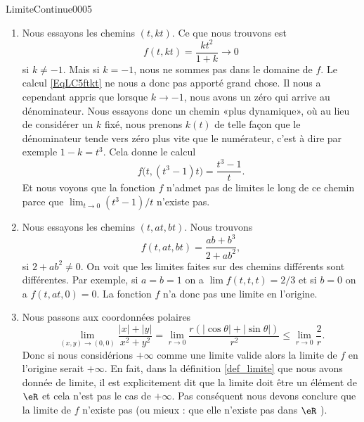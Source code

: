 \begin{corrige}{LimiteContinue0005}

	\begin{enumerate}
		\item
			Nous essayons les chemins $(t,kt)$. Ce que nous trouvons est
			\begin{equation}		\label{EqLC5ftkt}
				f(t,kt)=\frac{ kt^2 }{ 1+k }\to 0
			\end{equation}
			si $k\neq -1$. Mais si $k=-1$, nous ne sommes pas dans le domaine de $f$. Le calcul \eqref{EqLC5ftkt} ne nous a donc pas apporté grand chose. Il nous a cependant appris que lorsque $k\to -1$, nous avons un zéro qui arrive au dénominateur. Nous essayons donc un chemin «plus dynamique», où au lieu de considérer un $k$ fixé, nous prenons $k(t)$ de telle façon que le dénominateur tende vers zéro plus vite que le numérateur, c'est à dire par exemple $1-k=t^3$. Cela donne le calcul
			\begin{equation}
				f\big( t,(t^3-1)t \big)=\frac{ t^3-1 }{ t }.
			\end{equation}
			Et nous voyons que la fonction $f$ n'admet pas de limites le long de ce chemin parce que $\lim_{t\to 0} (t^3-1)/t$ n'existe pas.
                        \item Nous essayons les chemins $(t, at, bt)$. Nous trouvons
                          \begin{equation}
                            f(t,at,bt) = \frac{ab+b^3}{2+ab^2},
                          \end{equation}
                          si $2+ab^2\neq 0$. On voit que les limites faites sur des chemins différents sont différentes. Par exemple, si $a=b=1$ on a $\lim f (t,t,t)= 2/3$ et si $b=0$ on a $f(t,at, 0)= 0$. La fonction $f$ n'a donc pas une limite en l'origine.
                          \item Nous passons aux coordonnées polaires
                            \begin{equation}
                              \lim_{(x,y)\to (0,0)}\frac{|x|+|y|}{x^2+y^2}=\lim_{r\to 0}\frac{r(|\cos \theta|+|\sin \theta|)}{r^2}\leq \lim_{r\to 0} \frac{2}{r}. 
                            \end{equation}
                            Donc si nous considérions $+\infty$ comme une limite valide alors  la limite de $f$ en l'origine  serait $+\infty$. En fait, dans la définition \ref{def_limite} que nous avons donnée de limite, il est explicitement dit que la limite doit être un élément de $\eR$ et cela n'est pas le cas de $+\infty$. Pas conséquent nous devons conclure que la limite de $f$  n'existe pas (ou mieux : que elle n'existe pas dans $\eR$ ). 

\end{enumerate}
\end{corrige}
